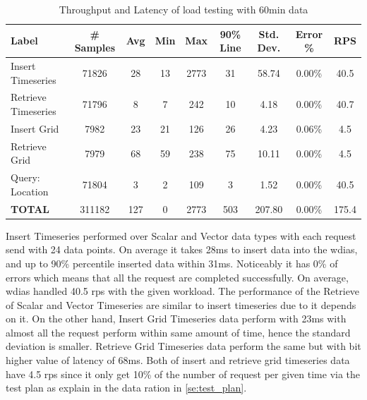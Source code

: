 \begin{table}[ht]
\caption{Throughput and Latency of load testing with 60min data}
\footnotesize
\begin{tabulary}{\linewidth}{|L|C|C|C|C|C|C|C|C|}
\hline
Label & \# Samples & Avg & Min & Max & 90\% Line & Std. Dev. & Error \% & RPS \\ \hline
Insert Timeseries & 71826 & 28 & 13 & 2773 & 31 & 58.74 & 0.00\% & 40.5 \\ \hline
Retrieve Timeseries & 71796 & 8 & 7 & 242 & 10 & 4.18 & 0.00\% & 40.7 \\ \hline
Insert Grid & 7982 & 23 & 21 & 126 & 26 & 4.23 & 0.06\% & 4.5 \\ \hline
Retrieve Grid & 7979 & 68 & 59 & 238 & 75 & 10.11 & 0.00\% & 4.5 \\ \hline
Query: Location & 71804 & 3 & 2 & 109 & 3 & 1.52 & 0.00\% & 40.5 \\ \hline
\textbf{TOTAL} & 311182 & 127 & 0 & 2773 & 503 & 207.80 & 0.00\% & 175.4 \\ \hline
\end{tabulary}
\label{tab:obs_all_60_min_summary}
\end{table}
Insert Timeseries performed over Scalar and Vector data types with each request send with 24 data points. On average it takes 28ms to insert data into the \acrshort{wdias}, and up to 90\% percentile inserted data within 31ms. Noticeably it has 0\% of errors which means that all the request are completed successfully. On average, \acrshort{wdias} handled 40.5 \acrshort{rps} with the given workload. The performance of the Retrieve of Scalar and Vector Timeseries are similar to insert timeseries due to it depends on it.
On the other hand, Insert Grid Timeseries data perform with 23ms with almost all the request perform within same amount of time, hence the standard deviation is smaller. Retrieve Grid Timeseries data perform the same but with bit higher value of latency of 68ms. Both of insert and retrieve grid timeseries data have 4.5 \acrshort{rps} since it only get 10\% of the number of request per given time via the test plan as explain in the data ration in \ref{se:test_plan}.

